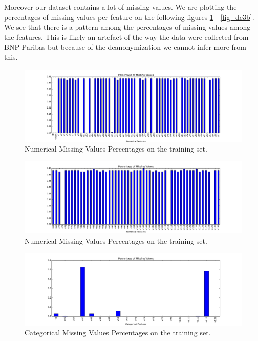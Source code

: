 \documentclass[conference, onecolumn]{IEEEtran}
\begin{document}
Moreover our dataset contains a lot of missing values. We are plotting the percentages of missing values per feature on the following figures \ref{fig_de2a} - \ref{fig_de3b}. We see that there is a pattern among the percentages of missing values among the features. This is likely an artefact of the way the data were collected from BNP Paribas but because of the deanonymization we cannot infer more from this.
\begin{figure}[htb]
\centering
\includegraphics[width=1\textwidth]{plot_de2a}
\caption{Numerical Missing Values Percentages on the training set.}
\label{fig_de2a}
\end{figure}
%
\begin{figure}[htb]
\centering
\includegraphics[width=1\textwidth]{plot_de2b}
\caption{Numerical Missing Values Percentages on the training set.}
\label{fig_de2b}
\end{figure}
%
\begin{figure}[htb]
\centering
\includegraphics[width=1\textwidth]{plot_de4}
\caption{Categorical Missing Values Percentages on the training set.}
\label{fig_de3a}
\end{figure}
\end{document}
